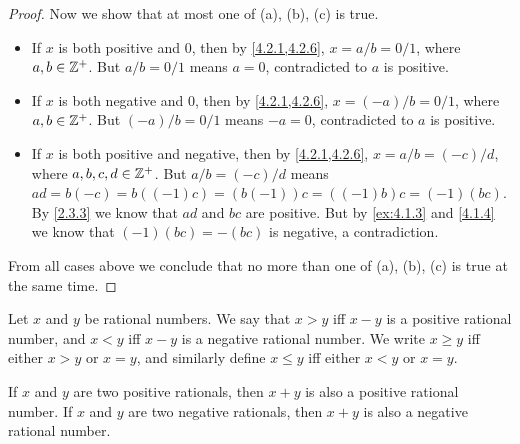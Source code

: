 \begin{proof}
  Now we show that at most one of (a), (b), (c) is true.
  \begin{itemize}
    \item If \(x\) is both positive and \(0\), then by \cref{4.2.1,4.2.6}, \(x = a / b = 0 / 1\), where \(a, b \in \mathbb{Z}^+\).
          But \(a / b = 0 / 1\) means \(a = 0\), contradicted to \(a\) is positive.
    \item If \(x\) is both negative and \(0\), then by \cref{4.2.1,4.2.6}, \(x = (-a) / b = 0 / 1\), where \(a, b \in \mathbb{Z}^+\).
          But \((-a) / b = 0 / 1\) means \(-a = 0\), contradicted to \(a\) is positive.
    \item If \(x\) is both positive and negative, then by \cref{4.2.1,4.2.6}, \(x = a / b = (-c) / d\), where \(a, b, c, d \in \mathbb{Z}^+\).
          But \(a / b = (-c) / d\) means \(ad = b(-c) = b((-1)c) = (b(-1))c = ((-1)b)c = (-1)(bc)\).
          By \cref{2.3.3} we know that \(ad\) and \(bc\) are positive.
          But by \cref{ex:4.1.3} and \cref{4.1.4} we know that \((-1)(bc) = -(bc)\) is negative, a contradiction.
  \end{itemize}
  From all cases above we conclude that no more than one of (a), (b), (c) is true at the same time.
\end{proof}

\begin{defn}\label{4.2.8}
  Let \(x\) and \(y\) be rational numbers.
  We say that \(x > y\) iff \(x - y\) is a positive rational number, and \(x < y\) iff \(x - y\) is a negative rational number.
  We write \(x \geq y\) iff either \(x > y\) or \(x = y\), and similarly define \(x \leq y\) iff either \(x < y\) or \(x = y\).
\end{defn}

\begin{ac}\label{ac:4.2.4}
  If \(x\) and \(y\) are two positive rationals, then \(x + y\) is also a positive rational number.
  If \(x\) and \(y\) are two negative rationals, then \(x + y\) is also a negative rational number.
\end{ac}

